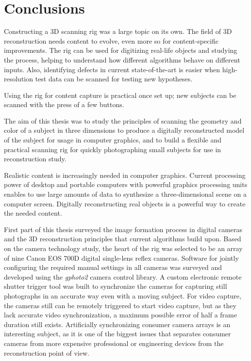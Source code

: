 \section{Conclusions} \label{sec:conclusion} %
Constructing a 3D scanning rig was a large topic on its own.
The field of 3D reconstruction needs content to evolve, even more so for content-specific improvements.
The rig can be used for digitizing real-life objects and studying the process, helping to understand how different algorithms behave on different inputs.
Also, identifying defects in current state-of-the-art is easier when high-resolution test data can be scanned for testing new hypotheses.


Using the rig for content capture is practical once set up; new subjects can be scanned with the press of a few buttons.

The aim of this thesis was to study the principles of scanning the geometry and color of a subject in three dimensions to produce a digitally reconstructed model of the subject for usage in computer graphics, and to build a flexible and practical scanning rig for quickly photographing small subjects for use in reconstruction study.

Realistic content is increasingly needed in computer graphics.
Current processing power of desktop and portable computers with powerful graphics processing units enables to use large amounts of data to synthesize a three-dimensional scene on a computer screen.
Digitally reconstructing real objects is a powerful way to create the needed content.

First part of this thesis surveyed the image formation process in digital cameras and the 3D reconstruction principles that current algorithms build upon.
Based on the camera technology study, the heart of the rig was selected to be an array of nine Canon EOS 700D digital single-lens reflex cameras.
Software for jointly configuring the required manual settings in all cameras was surveyed and developed using the \emph{gphoto2} camera control library.
A custom electronic remote shutter trigger tool was built to synchronize the cameras for capturing still photographs in an accurate way even with a moving subject.
For video capture, the cameras still can be remotely triggered to start video capture, but as they lack accurate video synchronization, a maximum possible error of half a frame duration still exists.
Artificially synchronizing consumer camera arrays is an interesting subject, as it is one of the biggest issues that separates consumer cameras from more expensive professional or engineering devices from the reconstruction point of view.


